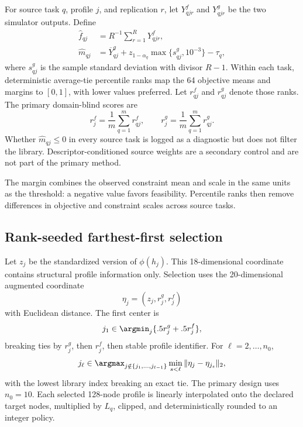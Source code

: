 For source task $q$, profile $j$, and replication $r$, let
$Y^f_{qjr}$ and $Y^g_{qjr}$ be the two simulator outputs.  Define
\begin{align}
 \widehat f_{qj}&=R^{-1}\sum_{r=1}^{R}Y^f_{qjr},\\
 \widehat m_{qj}&=\overline Y^g_{qj}
    +z_{1-\alpha_q}\max\{s^g_{qj},10^{-3}\}-\tau_q,
                                                        \label{eq:source-margin}
\end{align}
where $s^g_{qj}$ is the sample standard deviation with divisor $R-1$.
Within each task, deterministic average-tie percentile ranks map the 64
objective means and margins to $[0,1]$, with lower values preferred.  Let
$r^f_{qj}$ and $r^g_{qj}$ denote those ranks.  The primary domain-blind scores
are
\begin{equation}\label{eq:source-ranks}
 r^f_j=\frac1m\sum_{q=1}^m r^f_{qj},\qquad
 r^g_j=\frac1m\sum_{q=1}^m r^g_{qj}.
\end{equation}
Whether $\widehat m_{qj}\le0$ in every source task is logged as a diagnostic
but does not filter the library.  Descriptor-conditioned source weights are a
secondary control and are not part of the primary method.

The margin combines the observed constraint mean and scale in the same units
as the threshold: a negative value favors feasibility.  Percentile ranks then
remove differences in objective and constraint scales across source tasks.

\subsection{Rank-seeded farthest-first selection}

Let $z_j$ be the standardized version of $\phi(h_j)$.  This 18-dimensional
coordinate contains structural profile information only.  Selection uses the
20-dimensional augmented coordinate
\begin{equation}\label{eq:augmented-coordinate}
 \eta_j=(z_j,r^g_j,r^f_j)
\end{equation}
with Euclidean distance.  The first center is
\begin{equation}\label{eq:first-center}
 j_1\in\argmin_j \{.5r^g_j+.5r^f_j\},
\end{equation}
breaking ties by $r^g_j$, then $r^f_j$, then stable profile identifier.  For
$\ell=2,\ldots,n_0$,
\begin{equation}\label{eq:farthest-first}
 j_\ell\in\argmax_{j\notin\{j_1,\ldots,j_{\ell-1}\}}
 \min_{s<\ell}\|\eta_j-\eta_{j_s}\|_2,
\end{equation}
with the lowest library index breaking an exact tie.  The primary design uses
$n_0=10$.  Each selected 128-node profile is linearly interpolated onto the
declared target nodes, multiplied by $L_q$, clipped, and deterministically
rounded to an integer policy.

